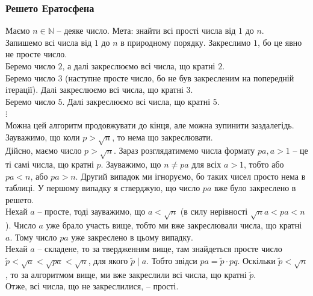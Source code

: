 \documentclass[a4paper, 10pt]{article}
\theoremstyle{theoremdd}
\theoremstyle{theoremdd}
\theoremstyle{theoremdd}
\theoremstyle{theoremdd}
\theoremstyle{theoremdd}
\theoremstyle{theoremdd}
\theoremstyle{theoremdd}
\theoremstyle{theoremdd}
\begin{document}
\subsubsection*{Решето Ератосфена}
Маємо $n \in \mathbb{N}$ -- деяке число. Мета: знайти всі прості числа від $1$ до $n$.\\
Запишемо всі числа від $1$ до $n$ в природному порядку. Закреслимо $1$, бо це явно не просте число.\\
Беремо число $2$, а далі закреслюємо всі числа, що кратні $2$.\\
Беремо число $3$ (наступне просте число, бо не був закресленим на попередній ітерації). Далі закреслюємо всі числа, що кратні $3$.\\
Беремо число $5$. Далі закреслюємо всі числа, що кратні $5$.\\
$\vdots$\\
Можна цей алгоритм продовжувати до кінця, але можна зупинити заздалегідь. Зауважимо, що коли $p > \sqrt{n}$, то нема що закреслювати.\\
Дійсно, маємо число $p > \sqrt{n}$. Зараз розглядатимемо числа формату $pa, a > 1$ -- це ті самі числа, що кратні $p$. Зауважимо, що $n \neq pa$ для всіх $a > 1$, тобто або $pa < n$, або $pa > n$. Другий випадок ми ігноруємо, бо таких чисел просто нема в таблиці. У першому випадку я стверджую, що число $pa$ вже було закреслено в решето. \\
Нехай $a$ -- просте, тоді зауважимо, що $a < \sqrt{n}$ (в силу нерівності $\sqrt{n} a < pa < n$). Число $a$ уже брало участь вище, тобто ми вже закреслювали числа, що кратні $a$. Тому число $pa$ уже закреслено в цьому випадку.\\
Нехай $a$ -- складене, то за твердженням вище, там знайдеться просте число $\tilde{p} < \sqrt{a} < \sqrt{pa} < \sqrt{n}$, для якого $\tilde{p} \mid a$. Тобто звідси $pa = \tilde{p} \cdot pq$. Оскільки $\tilde{p} < \sqrt{n}$, то за алгоритмом вище, ми вже закреслили всі числа, що кратні $\tilde{p}$.
\bigskip \\
Отже, всі числа, що не закреслилися, -- прості.
\end{document}
